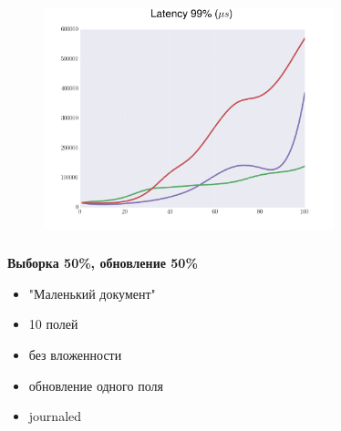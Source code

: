 \documentclass[18pt, compress, aspectratio=169]{beamer}
\begin{document}
\begin{frame}
    \frametitle{}
    \begin{center}
    \begin{figure}
        \includegraphics[width=0.75\textwidth,center]{benchmarks/workload_a_mongo_config/latency_99.png}
    \end{figure}
    \end{center}
\end{frame}

\begin{frame}
    \frametitle{}
    \begin{center}
        \textbf{Выборка 50\%, обновление 50\%}
        \begin{itemize}[label={}]
            \item "Маленький документ"
            \item 10 полей
            \item без вложенности
            \item обновление одного поля
            \item journaled
        \end{itemize}
    \end{center}
\end{frame}
\end{document}
